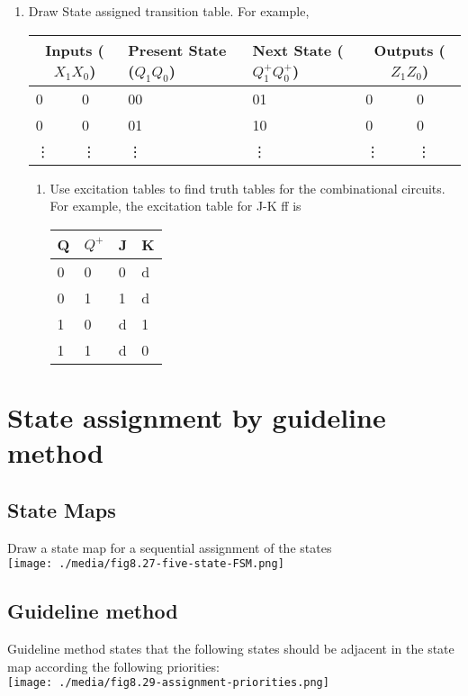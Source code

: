 \begin{enumerate}
   \item Draw State assigned transition table. For example,\\
     \begin{tabular}{llllll}
       \toprule
       \multicolumn{2}{c}{Inputs ($X_1 X_0$) } & Present State ($Q_1 Q_0$) & Next State ($Q_1^+Q_0^+$)& \multicolumn{2}{c}{Outputs ($Z_1 Z_0$)} \\
       \midrule
       0 & 0 & 00 & 01 & 0 & 0\\
       0 & 0 & 01 & 10 & 0 & 0\\
       \vdots & \vdots & \vdots & \vdots & \vdots & \vdots \\
       \bottomrule
     \end{tabular}
     \begin{enumerate}
       \item Use excitation tables to find truth tables for the combinational
         circuits. For example, the excitation table for J-K ff is\\
         \begin{tabular}{ll|ll}
           \toprule
           Q & $Q^{+}$ & J & K\\
           \midrule
           0 & 0 & 0 & d \\
           0 & 1 & 1 & d \\
           1 & 0 & d & 1 \\
           1 & 1 & d & 0 \\
           \bottomrule
         \end{tabular}
     \end{enumerate}
\end{enumerate}

\section{State assignment by guideline method ~\cite[Section~8.2.5]{katz2004contemporary}}
\subsection{State Maps}

\begin{example}
 Draw a state map for a sequential assignment  of the states\\
  \texttt{[image: ./media/fig8.27-five-state-FSM.png]}
\end{example}


\subsection{Guideline method}
Guideline method states that the following states should be adjacent in the
state map according the following priorities:\\
\texttt{[image: ./media/fig8.29-assignment-priorities.png]}


